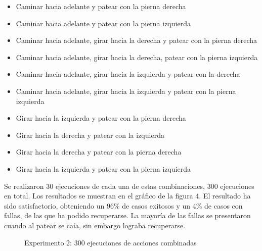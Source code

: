 \documentclass[tikz,conference, letterpaper]{IEEEtranMC1}
\begin{document}
\begin{itemize}
\setlength{\itemsep}{1pt}
\item Caminar hacia adelante y patear con la pierna derecha 
\item Caminar hacia adelante y patear con la pierna izquierda
\item Caminar hacia adelante, girar hacia la derecha y patear con la pierna derecha
\item Caminar hacia adelante, girar hacia la derecha, patear con la pierna izquierda 
\item Caminar hacia adelante, girar hacia la izquierda y patear con la derecha
\item Caminar hacia adelante, girar hacia la  izquierda y  patear con la pierna izquierda
\item Girar hacia la izquierda y patear con la pierna derecha
\item Girar hacia la derecha y patear con la izquierda
\item Girar hacia la derecha y patear con la pierna derecha
\item Girar hacia la izquierda y patear con la pierna izquierda
 \end{itemize}

Se realizaron 30 ejecuciones de cada una de estas combinaciones, 300 ejecuciones en total. Los resultados se muestran en el gráfico de la figura 4. El resultado ha sido satisfactorio, obteniendo un 96\% de casos exitosos y un 4\% de casos con fallas, de las que ha podido recuperarse. La mayoría de las fallas se presentaron cuando al patear se caía, sin embargo lograba recuperarse.  

\begin{figure}[th!]

\caption{Experimento 2: 300 ejecuciones de acciones combinadas}
\end{figure}
\end{document}
